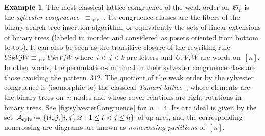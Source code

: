 \documentclass{amsart}
\theoremstyle{definition}
\newtheorem{example}[theorem]{Example}
\newcommand{\f}[1]{{\mathfrak{#1}}} %
\newcommand{\set}[2]{\left\{ #1 \;\middle|\; #2 \right\}} %
\newcommand{\eqdef}{\mbox{\,\raisebox{0.2ex}{\scriptsize\ensuremath{\mathrm:}}\ensuremath{=}\,}} %
\newcommand{\darkblue}{\color{darkblue}} %
\newcommand{\defn}[1]{\textsl{\darkblue #1}} %
\newcommand{\arcs}{{\mathcal{A}}} %
\begin{document}
\begin{example}
\label{exm:sylvesterCongruence}
The most classical lattice congruence of the weak order on~$\f{S}_n$ is the \defn{sylvester congruence}~$\equiv_\textrm{sylv}$ \cite{LodayRonco, HivertNovelliThibon-algebraBinarySearchTrees}.
Its congruence classes are the fibers of the binary search tree insertion algorithm, or equivalently the sets of linear extensions of binary trees (labeled in inorder and considered as posets oriented from bottom to top).
It can also be seen as the transitive closure of the rewriting rule~$U i k V j W \equiv_\textrm{sylv} U k i V j W$ where~$i < j < k$ are letters and~$U,V,W$ are words on~$[n]$.
In other words, the permutations minimal in their sylvester congruence class are those avoiding the pattern~$312$.
The quotient of the weak order by the sylvester congruence is (isomorphic to) the classical \defn{Tamari lattice}~\cite{Tamari}, whose elements are the binary trees on~$n$ nodes and whose cover relations are right rotations in binary trees.
See \cref{fig:sylvesterCongruence} for~$n = 4$.
Its arc ideal is given by the set~$\arcs_\textrm{sylv} \eqdef \set{(i, j, {]i,j[}, \varnothing}{1 \le i < j \le n}$ of up arcs, and the corresponding noncrossing arc diagrams are known as \defn{noncrossing partitions} of~$[n]$.
%
\begin{figure}
	\capstart

\end{figure}
\end{example}
\end{document}
